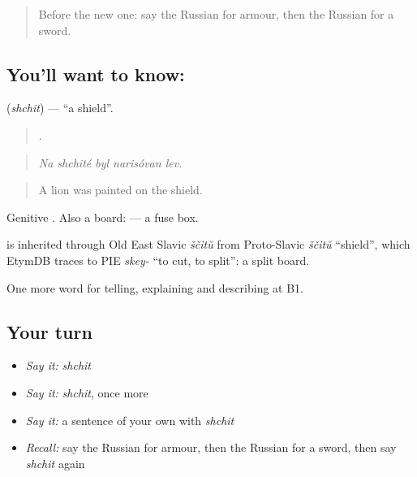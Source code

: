 \label{lesson:RU-C322-shchit}



\begin{quote}
Before the new one: say the Russian for armour, then the Russian for a sword.
\end{quote}

\subsection*{You'll want to know: }
\textbf{} (\emph{shchit}) — \textquotedblleft{}a shield\textquotedblright{}.

\begin{quote}
    .
\end{quote}

\begin{quote}
\emph{Na shchité byl narisóvan lev.}
\end{quote}

\begin{quote}
A lion was painted on the shield.
\end{quote}

Genitive \emph{}. Also a board: \emph{ } — a fuse box.

\begin{cousinweb}
\emph{} is inherited through Old East Slavic \emph{ščitŭ} from Proto-Slavic \emph{ščitŭ} \textquotedblleft{}shield\textquotedblright{}, which EtymDB traces to PIE \emph{skey-} \textquotedblleft{}to cut, to split\textquotedblright{}: a split board.
\end{cousinweb}

\begin{grammarlens}[title={What you've built}]
One more word for telling, explaining and describing at B1.
\end{grammarlens}

\subsection*{Your turn}
\begin{itemize}
\raggedright
  \item \emph{Say it:} \emph{shchit}
  \item \emph{Say it:} \emph{shchit}, once more
  \item \emph{Say it:} a sentence of your own with \emph{shchit}
  \item \emph{Recall:} say the Russian for armour, then the Russian for a sword, then say \emph{shchit} again
\end{itemize}


